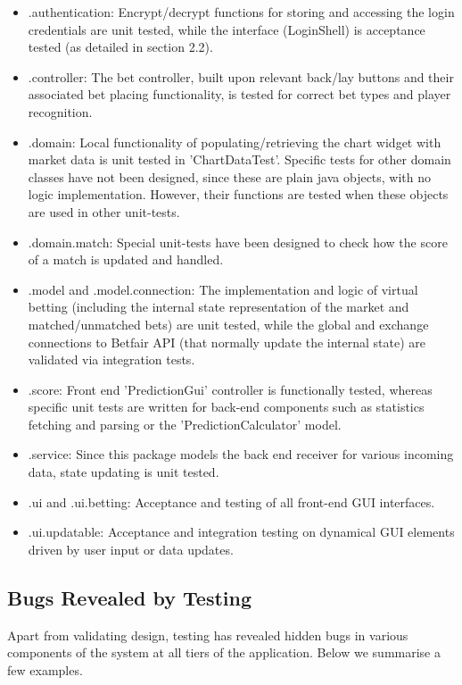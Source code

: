 \documentclass[10pt]{report}
\begin{document}
\begin{itemize}
\renewcommand{\labelitemi}{$\bullet$}
\item .authentication: Encrypt/decrypt functions for storing and accessing the login credentials are unit tested, while the interface (LoginShell) is acceptance tested (as detailed in section 2.2).
\item .controller: The bet controller, built upon relevant back/lay buttons and their associated bet placing functionality, is tested for correct bet types and player recognition.
\item .domain: Local functionality of populating/retrieving the chart widget with market data is unit tested in 'ChartDataTest'. Specific tests for other domain classes have not been designed, since these are plain java objects, with no logic implementation. However, their functions are tested when these objects are used in other unit-tests.
\item .domain.match: Special unit-tests have been designed to check how the score of a match is updated and handled.
\item .model and .model.connection: The implementation and logic of virtual betting (including the internal state representation of the market and matched/unmatched bets) are unit tested, while the global and exchange connections to Betfair API (that normally update the internal state) are validated via integration tests.     
\item .score: Front end 'PredictionGui' controller is functionally tested, whereas specific unit tests are written for back-end components such as statistics fetching and parsing or the 'PredictionCalculator' model. 
\item .service: Since this package models the back end receiver for various incoming data, state updating is unit tested.
\item .ui and .ui.betting: Acceptance and testing of all front-end GUI interfaces.
\item .ui.updatable: Acceptance and integration testing on dynamical GUI elements driven by user input or data updates.
\end{itemize}

\subsection{Bugs Revealed by Testing}

Apart from validating design, testing has revealed hidden bugs in various components of the system at all tiers of the application. Below we summarise a few examples.
\end{document}
